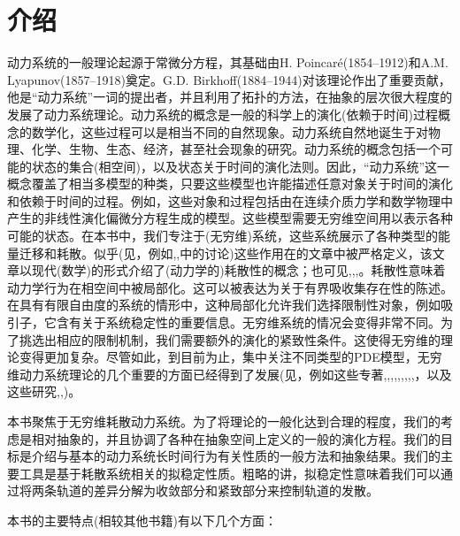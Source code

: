 \ch\chapter{介\quad 绍}

动力系统的一般理论起源于常微分方程，其基础由H. Poincaré(1854–1912)和A.M. Lyapunov(1857–1918)奠定。G.D. Birkhoff(1884–1944)对该理论作出了重要贡献，他是“动力系统”一词的提出者，并且利用了拓扑的方法，在抽象的层次很大程度的发展了动力系统理论。动力系统的概念是一般的科学上的演化(依赖于时间)过程概念的数学化，这些过程可以是相当不同的自然现象。动力系统自然地诞生于对物理、化学、生物、生态、经济，甚至社会现象的研究。动力系统的概念包括一个可能的状态的集合(相空间)，以及状态关于时间的演化法则。因此，“动力系统”这一概念覆盖了相当多模型的种类，只要这些模型也许能描述任意对象关于时间的演化和依赖于时间的过程。例如，这些对象和过程包括由在连续介质力学和数学物理中产生的非线性演化偏微分方程生成的模型。这些模型需要无穷维空间用以表示各种可能的状态。在本书中，我们专注于(无穷维)系统，这些系统展示了各种类型的能量迁移和耗散。似乎(见，例如\cite{Hale88},\cite{Raugel02},\cite{Temam97}中的讨论)这些作用在\cite{Levinson45}的文章中被严格定义，该文章以现代(数学)的形式介绍了(动力学的)耗散性的概念；也可见\cite{Billoti71},\cite{Coddington55},\cite{Pliss66},\cite{Pliss77}。耗散性意味着动力学行为在相空间中被局部化。这可以被表达为关于有界吸收集存在性的陈述。在具有有限自由度的系统的情形中，这种局部化允许我们选择限制性对象，例如吸引子，它含有关于系统稳定性的重要信息。无穷维系统的情况会变得非常不同。为了挑选出相应的限制机制，我们需要额外的演化的紧致性条件。这使得无穷维的理论变得更加复杂。尽管如此，到目前为止，集中关注不同类型的PDE模型，无穷维动力系统理论的几个重要的方面已经得到了发展(见，例如这些专著\cite{Babin92},\cite{Chepyzhov02},\cite{Chueshov99},\cite{Chueshov10},\cite{Chueshov08},\cite{Hale88},\cite{Ladyzhenskaya91},\cite{Robinson01},\cite{Sell02},\cite{Temam97}，以及这些研究\cite{Babin06},\cite{Miranville08},\cite{Raugel02})。
	
本书聚焦于无穷维耗散动力系统。为了将理论的一般化达到合理的程度，我们的考虑是相对抽象的，并且协调了各种在抽象空间上定义的一般的演化方程。我们的目标是介绍与基本的动力系统长时间行为有关性质的一般方法和抽象结果。我们的主要工具是基于耗散系统相关的拟稳定性质。粗略的讲，拟稳定性意味着我们可以通过将两条轨道的差异分解为收敛部分和紧致部分来控制轨道的发散。
	
本书的主要特点(相较其他书籍)有以下几个方面：

